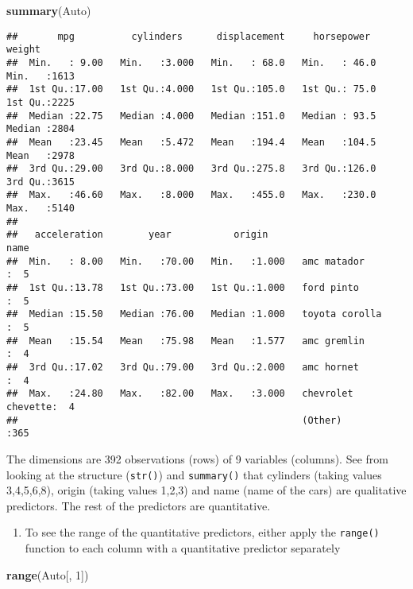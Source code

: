 \documentclass[
]{article}
\newenvironment{Shaded}{\begin{snugshade}}{\end{snugshade}}
\newcommand{\DecValTok}[1]{\textcolor[rgb]{0.00,0.00,0.81}{#1}}
\newcommand{\FunctionTok}[1]{\textcolor[rgb]{0.13,0.29,0.53}{\textbf{#1}}}
\newcommand{\NormalTok}[1]{#1}
\providecommand{\tightlist}{%
  \setlength{\itemsep}{0pt}\setlength{\parskip}{0pt}}
\begin{document}
\begin{Shaded}
\begin{Highlighting}[]
\FunctionTok{summary}\NormalTok{(Auto)}
\end{Highlighting}
\end{Shaded}

\begin{verbatim}
##       mpg          cylinders      displacement     horsepower        weight    
##  Min.   : 9.00   Min.   :3.000   Min.   : 68.0   Min.   : 46.0   Min.   :1613  
##  1st Qu.:17.00   1st Qu.:4.000   1st Qu.:105.0   1st Qu.: 75.0   1st Qu.:2225  
##  Median :22.75   Median :4.000   Median :151.0   Median : 93.5   Median :2804  
##  Mean   :23.45   Mean   :5.472   Mean   :194.4   Mean   :104.5   Mean   :2978  
##  3rd Qu.:29.00   3rd Qu.:8.000   3rd Qu.:275.8   3rd Qu.:126.0   3rd Qu.:3615  
##  Max.   :46.60   Max.   :8.000   Max.   :455.0   Max.   :230.0   Max.   :5140  
##                                                                                
##   acceleration        year           origin                      name    
##  Min.   : 8.00   Min.   :70.00   Min.   :1.000   amc matador       :  5  
##  1st Qu.:13.78   1st Qu.:73.00   1st Qu.:1.000   ford pinto        :  5  
##  Median :15.50   Median :76.00   Median :1.000   toyota corolla    :  5  
##  Mean   :15.54   Mean   :75.98   Mean   :1.577   amc gremlin       :  4  
##  3rd Qu.:17.02   3rd Qu.:79.00   3rd Qu.:2.000   amc hornet        :  4  
##  Max.   :24.80   Max.   :82.00   Max.   :3.000   chevrolet chevette:  4  
##                                                  (Other)           :365
\end{verbatim}

The dimensions are 392 observations (rows) of 9 variables (columns). See
from looking at the structure (\texttt{str()}) and \texttt{summary()}
that cylinders (taking values 3,4,5,6,8), origin (taking values 1,2,3)
and name (name of the cars) are qualitative predictors. The rest of the
predictors are quantitative.

\begin{enumerate}
\def\labelenumi{\alph{enumi})}
\setcounter{enumi}{1}
\tightlist
\item
  To see the range of the quantitative predictors, either apply the
  \texttt{range()} function to each column with a quantitative predictor
  separately
\end{enumerate}

\begin{Shaded}
\begin{Highlighting}[]
\FunctionTok{range}\NormalTok{(Auto[, }\DecValTok{1}\NormalTok{])}
\end{Highlighting}
\end{Shaded}
\end{document}
